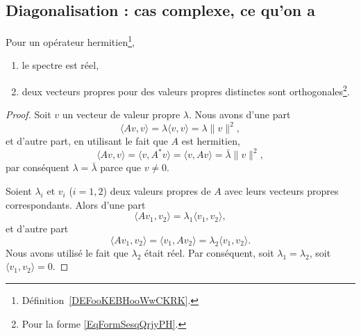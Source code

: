 \subsection{Diagonalisation : cas complexe, ce qu'on a}

\begin{lemma}      \label{LEMooVCEOooIXnTpp}
    Pour un opérateur hermitien\footnote{Définition~\ref{DEFooKEBHooWwCKRK}.},
    \begin{enumerate}
        \item
            le spectre est réel,
        \item
            deux vecteurs propres pour des valeurs propres distinctes sont orthogonales\footnote{Pour la forme \eqref{EqFormSesqQrjyPH}.}.
    \end{enumerate}
\end{lemma}

\begin{proof}
    Soit \( v\) un vecteur de valeur propre \( \lambda\). Nous avons d'une part
    \begin{equation}
        \langle Av, v\rangle =\lambda\langle v, v\rangle =\lambda\| v \|^2,
    \end{equation}
    et d'autre part, en utilisant le fait que \( A\) est hermitien,
    \begin{equation}
        \langle Av, v\rangle =\langle v, A^*v\rangle =\langle v, Av\rangle =\bar\lambda\| v \|^2,
    \end{equation}
    par conséquent \( \lambda=\bar\lambda\) parce que \( v\neq 0\).

    Soient \( \lambda_i\) et \( v_i\) (\( i=1,2\)) deux valeurs propres de \( A\) avec leurs vecteurs propres correspondants. Alors d'une part
    \begin{equation}
        \langle Av_1, v_2\rangle =\lambda_1\langle v_1, v_2\rangle ,
    \end{equation}
    et d'autre part
    \begin{equation}
        \langle Av_1, v_2\rangle =\langle v_1, Av_2\rangle =\lambda_2\langle v_1, v_2\rangle .
    \end{equation}
    Nous avons utilisé le fait que \( \lambda_2\) était réel. Par conséquent, soit \( \lambda_1=\lambda_2\), soit \( \langle v_1, v_2\rangle =0\).
\end{proof}

